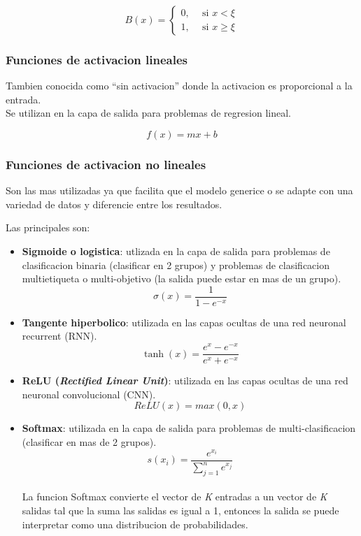 \documentclass[runningheads]{llncs} %
\begin{document}
\[
    B(x) =
    \left \{
        \begin{aligned}
        0, \ \ & \text{si } x < \xi  \\
        1, \ \ & \text{si } x \geq \xi
        \end{aligned}
    \right .
\]

\subsubsection{Funciones de activacion lineales}
Tambien conocida como \textquotedblleft{}sin activacion\textquotedblright{} 
donde la activacion es proporcional a la entrada. \cite{fun-activacion2} \\
Se utilizan en la capa de salida para problemas de regresion lineal. \cite{fun-activacion}

\[ f(x)=mx+b \]

\subsubsection{Funciones de activacion no lineales}
Son las mas utilizadas ya que facilita que el modelo generice o se adapte con una 
variedad de datos y diferencie entre los resultados. \cite{fun-activacion2}

Las principales son: 
\begin{itemize}
    \item{\textbf{Sigmoide o logistica}: utlizada en la capa de salida
    para problemas de clasificacion binaria (clasificar en 2 grupos) y problemas
    de clasificacion multietiqueta o multi-objetivo (la salida puede estar 
    en mas de un grupo). \cite{fun-activacion}
    \[\sigma(x) = \frac{1}{1-e^{-x}}\] } 
    \item{\textbf{Tangente hiperbolico}: utilizada en las capas ocultas 
    de una red neuronal recurrent (RNN). \cite{fun-activacion}
    \[\tanh(x) = \frac{e^{x}-e^{-x}}{e^{x}+e^{-x}}\]}
    \item{\textbf{ReLU (\textit{Rectified Linear Unit})}: utilizada en las capas
    ocultas de una red neuronal convolucional (CNN). \cite{fun-activacion}
    \[ReLU(x) = max(0,x)\]} 
    \item{\textbf{Softmax}: utilizada en la capa de salida para problemas
    de multi-clasificacion (clasificar en mas de 2 grupos). \cite{fun-activacion}
    \[ s(x_{i}) = \frac{e^{x_{i}}}{\sum_{j=1}^{n}{e^{x_{j}}}} \]}\\
    La funcion Softmax convierte el vector de \textit{K} entradas a un vector 
    de \textit{K} salidas tal que la suma las salidas es igual a 1,
    entonces la salida se puede interpretar como una distribucion de probabilidades.
    \cite{fun-softmax}
\end{itemize}
\end{document}
